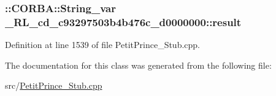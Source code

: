 \subsubsection[{\texorpdfstring{result}{result}}]{\setlength{\rightskip}{0pt plus 5cm}\+::C\+O\+R\+B\+A\+::\+String\+\_\+var \+\_\+R\+L\+\_\+cd\+\_\+c93297503b4b476c\+\_\+d0000000\+::result}\hypertarget{class__0_r_l__cd__c93297503b4b476c__d0000000_a85333e8615ac624f1ed70841d68adc3a}{}\label{class__0_r_l__cd__c93297503b4b476c__d0000000_a85333e8615ac624f1ed70841d68adc3a}


Definition at line 1539 of file Petit\+Prince\+\_\+\+Stub.\+cpp.



The documentation for this class was generated from the following file\+:\begin{DoxyCompactItemize}
\item 
src/\hyperlink{_petit_prince___stub_8cpp}{Petit\+Prince\+\_\+\+Stub.\+cpp}\end{DoxyCompactItemize}
